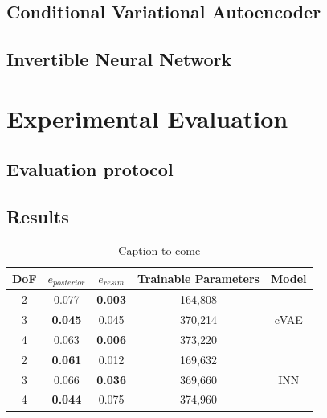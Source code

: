 \documentclass[conference]{IEEEtran}
\begin{document}
\subsection*{Conditional Variational Autoencoder}

\subsection*{Invertible Neural Network}

\section*{Experimental Evaluation}

\subsection*{Evaluation protocol}
\subsection*{Results}

\begin{table}[h]
\centering
\begin{tabular}{|c|c|c|c|c|}
\hline
 DoF & $e_{posterior}$ & $e_{resim}$ & Trainable Parameters & Model \\
 \hline
 2  & 0.077 & \textbf{0.003} & 164,808 & \\
 3  & \textbf{0.045} & 0.045 & 370,214 & cVAE \\
 4  & 0.063 & \textbf{0.006} & 373,220 & \\
 \hline
 2  & \textbf{0.061} & 0.012 & 169,632 & \\
 3  & 0.066 & \textbf{0.036} & 369,660 & INN \\
 4  & \textbf{0.044} & 0.075 & 374,960 & \\
 \hline
\end{tabular}
\caption{\label{tab:results} Caption to come}
\end{table}
\end{document}
